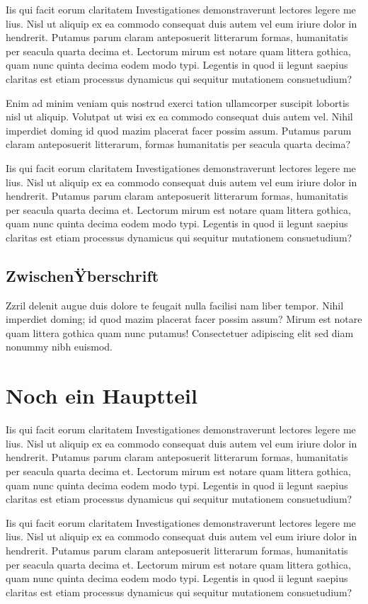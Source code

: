 \documentclass[a4paper,12pt]{scrartcl}
\begin{document}
Iis qui facit eorum claritatem Investigationes demonstraverunt lectores legere me lius. Nisl ut aliquip ex ea commodo consequat duis autem vel eum iriure dolor in hendrerit. Putamus parum claram anteposuerit litterarum formas, humanitatis per seacula quarta decima et. Lectorum mirum est notare quam littera gothica, quam nunc quinta decima eodem modo typi. Legentis in quod ii legunt saepius claritas est etiam processus dynamicus qui sequitur mutationem consuetudium?

Enim ad minim veniam quis nostrud exerci tation ullamcorper suscipit lobortis nisl ut aliquip. Volutpat ut wisi ex ea commodo consequat duis autem vel. Nihil imperdiet doming id quod mazim placerat facer possim assum. Putamus parum claram anteposuerit litterarum, formas humanitatis per seacula quarta decima?

Iis qui facit eorum claritatem Investigationes demonstraverunt lectores legere me lius. Nisl ut aliquip ex ea commodo consequat duis autem vel eum iriure dolor in hendrerit. Putamus parum claram anteposuerit litterarum formas, humanitatis per seacula quarta decima et. Lectorum mirum est notare quam littera gothica, quam nunc quinta decima eodem modo typi. Legentis in quod ii legunt saepius claritas est etiam processus dynamicus qui sequitur mutationem consuetudium?

\subsection{ZwischenŸberschrift}
Zzril delenit augue duis dolore te feugait nulla facilisi nam liber tempor. Nihil imperdiet doming; id quod mazim placerat facer possim assum? Mirum est notare quam littera gothica quam nunc putamus! Consectetuer adipiscing elit sed diam nonummy nibh euismod.

\section{Noch ein Hauptteil}
 Iis qui facit eorum claritatem Investigationes demonstraverunt lectores legere me lius. Nisl ut aliquip ex ea commodo consequat duis autem vel eum iriure dolor in hendrerit. Putamus parum claram anteposuerit litterarum formas, humanitatis per seacula quarta decima et. Lectorum mirum est notare quam littera gothica, quam nunc quinta decima eodem modo typi. Legentis in quod ii legunt saepius claritas est etiam processus dynamicus qui sequitur mutationem consuetudium?

 Iis qui facit eorum claritatem Investigationes demonstraverunt lectores legere me lius. Nisl ut aliquip ex ea commodo consequat duis autem vel eum iriure dolor in hendrerit. Putamus parum claram anteposuerit litterarum formas, humanitatis per seacula quarta decima et. Lectorum mirum est notare quam littera gothica, quam nunc quinta decima eodem modo typi. Legentis in quod ii legunt saepius claritas est etiam processus dynamicus qui sequitur mutationem consuetudium?
\end{document}
